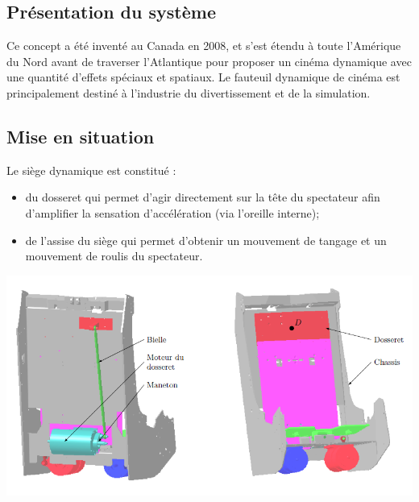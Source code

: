 \documentclass[10pt,fleqn]{article} %
\begin{document}

\vspace{4.5cm}
\pagestyle{fancy}
\thispagestyle{plain}

\def\columnseprulecolor{\color{ocre}}
\setlength{\columnseprule}{0.4pt} 

\def\pathfig{images}

\begin{multicols}{2}



\section*{Présentation du système}

Ce concept a été inventé au Canada en 2008, et s'est étendu à toute l'Amérique du Nord avant de traverser l'Atlantique pour proposer un cinéma dynamique avec une quantité d'effets spéciaux et spatiaux. Le fauteuil dynamique de cinéma est principalement destiné à l'industrie du divertissement et de la simulation.

\subsection*{Mise en situation}

Le siège dynamique est constitué :
\begin{itemize}
\item du dosseret qui permet d'agir directement sur la tête du spectateur afin d'amplifier la sensation d'accélération (via
l'oreille interne);%
\item de l'assise du siège qui permet d'obtenir un mouvement de tangage et un mouvement de roulis du spectateur.
\end{itemize}

\begin{center}
\includegraphics[width=\linewidth]{images/image4.png}


\end{center}
\end{multicols}
\end{document}
